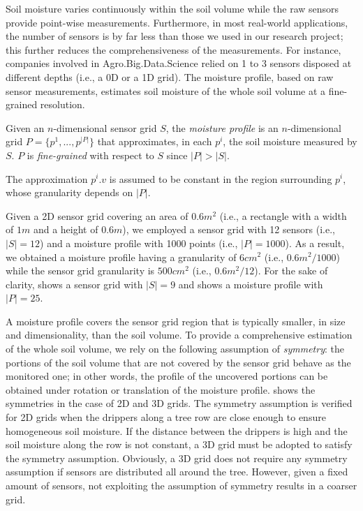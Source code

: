 Soil moisture varies continuously within the soil volume while the raw sensors provide point-wise measurements.
Furthermore, in most real-world applications, the number of sensors is by far less than those we used in our research project; this further reduces the comprehensiveness of the measurements.
For instance, companies involved in Agro.Big.Data.Science \cite{ABDS} relied on 1 to 3 sensors disposed at different depths (i.e., a 0D or a 1D grid).
The moisture profile, based on raw sensor measurements, estimates soil moisture of the whole soil volume at a fine-grained resolution.

\begin{definition}
Given an $n$-dimensional sensor grid $S$, the \emph{moisture profile} is an $n$-dimensional grid $P = \{p^1, ..., p^{|P|}\}$ that approximates, in each $p^i$, the soil moisture measured by $S$. $P$ is \emph{fine-grained} with respect to $S$ since $|P| > |S|$. 
\end{definition}

The approximation $p^i.v$ is assumed to be constant in the region surrounding $p^i$, whose granularity depends on $|P|$.

\begin{example}
Given a 2D sensor grid covering an area of $0.6 m^2$ (i.e., a rectangle with a width of $1m$ and a height of $0.6m$), we employed a sensor grid with 12 sensors (i.e., $|S| = 12$) and a moisture profile with 1000 points (i.e., $|P| = 1000$). As a result, we obtained a moisture profile having a granularity of $6 cm^2$ (i.e., $0.6 m^2 / 1000$) while the sensor grid granularity is $500cm^2$ (i.e., $0.6 m^2 / 12$). For the sake of clarity,  shows a sensor grid with $|S|=9$ and  shows a moisture profile with $|P|=25$.
\end{example}

A moisture profile covers the sensor grid region that is typically smaller, in size and dimensionality, than the soil volume. To provide a comprehensive estimation of the whole soil volume, we rely on the following assumption of \emph{symmetry}: the portions of the soil volume that are not covered by the sensor grid behave as the monitored one; in other words, the profile of the uncovered portions can be obtained under rotation or translation of the moisture profile.
 shows the symmetries in the case of 2D and 3D grids.
The symmetry assumption is verified for 2D grids when the drippers along a tree row are close enough to ensure homogeneous soil moisture.
If the distance between the drippers is high and the soil moisture along the row is not constant, a 3D grid must be adopted to satisfy the symmetry assumption.
Obviously, a 3D grid does not require any symmetry assumption if sensors are distributed all around the tree.
However, given a fixed amount of sensors, not exploiting the assumption of symmetry results in a coarser grid.

